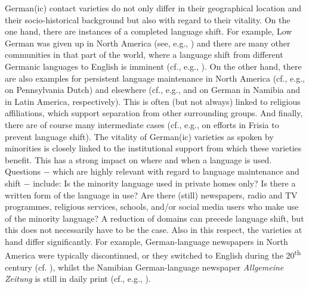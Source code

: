 \documentclass[output=paper]{langsci/langscibook}
\begin{document}
German(ic) contact varieties do not only differ in their geographical location and their socio-historical background but also with regard to their vitality. On the one hand, there are instances of a completed language shift. For example, Low German was given up in North America (see, e.g., ) and there are many other communities in that part of the world, where a language shift from different Germanic languages to English is imminent (cf., e.g., \citealt{page_moribund_2015}). On the other hand, there are also examples for persistent language maintenance in North America (cf., e.g., \citealt{Louden2016} on Pennsylvania Dutch) and elsewhere (cf., e.g., \citealt{shah_german_2018} and \citealt{rosenberg_lateinamerika_2018} on German in Namibia and in Latin America, respectively). This is often (but not always) linked to religious affiliations, which support separation from other surrounding groups. And finally, there are of course many intermediate cases (cf., e.g.,  on efforts in Frisia to prevent language shift). The vitality of German(ic) varieties as spoken by minorities is closely linked to the institutional support from which these varieties benefit. This has a strong impact on where and when a language is used. Questions $-$ which are highly relevant with regard to language maintenance and shift $-$ include: Is the minority language used in private homes only? Is there a written form of the language in use? Are there (still) newspapers, radio and TV programmes, religious services, schools, and/or social media users who make use of the minority language? A reduction of domains can precede language shift, but this does not necessarily have to be the case. Also in this respect, the varieties at hand differ significantly. For example, German-language newspapers in North America were typically discontinued, or they switched to English during the 20\textsuperscript{th} century (cf. ), whilst the Namibian German-language newspaper \textit{Allgemeine} \textit{Zeitung} is still in daily print (cf., e.g., \citealt{shah_german_2018}).
\end{document}
